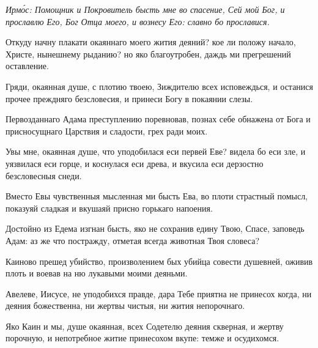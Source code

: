 \begin{Parallel}{}{}


\end{Parallel}

\mychapterending

 

\itshape Ирм\'{о}с\normalfont{}: Помощник и Покровитель бысть мне во спасение, Сей мой Бог, и прославлю Его, Бог Отца моего, и вознесу Его: славно бо прославися.

Откуду начну плакати окаяннаго моего жития деяний? кое ли положу начало, Христе, нынешнему рыданию? но яко благоутробен, даждь ми прегрешений оставление.

Гряди, окаянная душе, с плотию твоею, Зиждителю всех исповеждься, и останися прочее преждняго безсловесия, и принеси Богу в покаянии слезы.

Первозданнаго Адама преступлению поревновав, познах себе обнажена от Бога и присносущнаго Царствия и сладости, грех ради моих.

Увы мне, окаянная душе, что уподобилася еси первей Еве? видела бо еси зле, и уязвилася еси горце, и коснулася еси древа, и вкусила еси дерзостно безсловесныя снеди.

Вместо Евы чувственныя мысленная ми бысть Ева, во плоти страстный помысл, показуяй сладкая и вкушаяй присно горькаго напоения.

Достойно из Едема изгнан бысть, яко не сохранив едину Твою, Спасе, заповедь Адам: аз же что постражду, отметая всегда животная Твоя словеса?

Каиново прешед убийство, произволением бых убийца совести душевней, оживив плоть и воевав на ню лукавыми моими деяньми.

Авелеве, Иисусе, не уподобихся правде, дара Тебе приятна не принесох когда, ни деяния божественна, ни жертвы чистыя, ни жития непорочнаго.

Яко Каин и мы, душе окаянная, всех Содетелю деяния скверная, и жертву порочную, и непотребное житие принесохом вкупе: темже и осудихомся.

